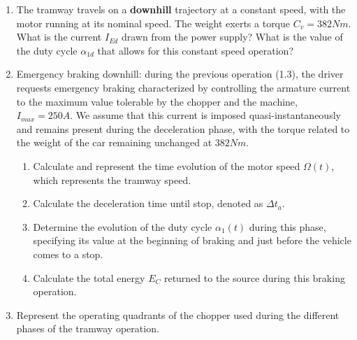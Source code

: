 \begin{enumerate}
\begin{enumerate}
\item The tramway travels on a \textbf{downhill} trajectory at a constant speed, with the motor running at its nominal speed. The weight exerts a torque $C_v = 382 Nm$. What is the current $I_{Ed}$ drawn from the power supply? What is the value of the duty cycle $\alpha_{1d}$ that allows for this constant speed operation?
\item Emergency braking downhill: during the previous operation (1.3), the driver requests emergency braking characterized by controlling the armature current to the maximum value tolerable by the chopper and the machine, $I_{max} = 250 A$. We assume that this current is imposed quasi-instantaneously and remains present during the deceleration phase, with the torque related to the weight of the car remaining unchanged at $382 Nm$.

\begin{enumerate}
\item Calculate and represent the time evolution of the motor speed $\Omega(t)$, which represents the tramway speed.
\item Calculate the deceleration time until stop, denoted as $\Delta t_a$.
\item Determine the evolution of the duty cycle $\alpha_1(t)$ during this phase, specifying its value at the beginning of braking and just before the vehicle comes to a stop.
\item Calculate the total energy $E_C$ returned to the source during this braking operation.
\end{enumerate}

\item Represent the operating quadrants of the chopper used during the different phases of the tramway operation.
\end{enumerate}




\end{enumerate}
